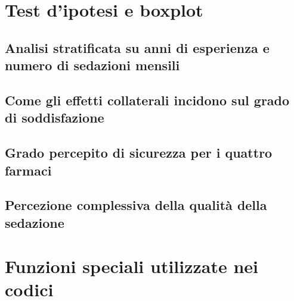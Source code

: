 \newpage

\section{Test d'ipotesi e boxplot}

    \subsection{Analisi stratificata su anni di esperienza e numero di sedazioni mensili}
    \label{code:quality-strati}
    
    \newpage

    \subsection{Come gli effetti collaterali incidono sul grado di soddisfazione}
    \label{code:adverse-effects-perception}
    
    \newpage

    \subsection{Grado percepito di sicurezza per i quattro farmaci}
    \label{code:safety}
    
    \newpage

    \subsection{Percezione complessiva della qualità della sedazione}
    \label{code:quality-global}
    
    \newpage

\newpage

\section{Funzioni speciali utilizzate nei codici}
\label{code:subroutines}

    
    \bigskip

    
    \bigskip

    \newpage

    
    \bigskip

